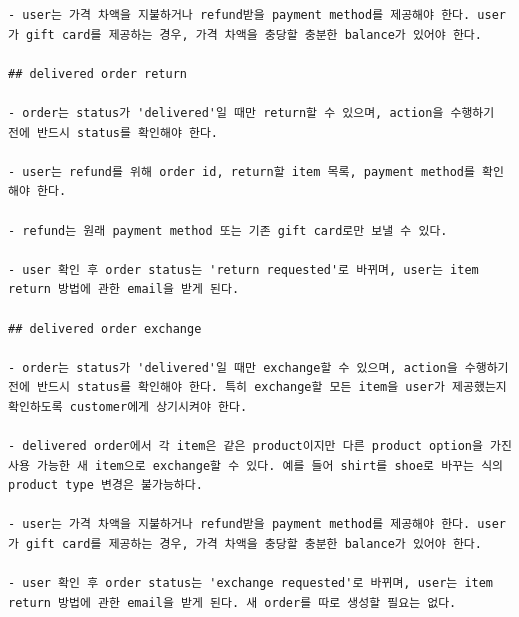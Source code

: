 \begin{verbatim}
- user는 가격 차액을 지불하거나 refund받을 payment method를 제공해야 한다. user가 gift card를 제공하는 경우, 가격 차액을 충당할 충분한 balance가 있어야 한다.

## delivered order return

- order는 status가 'delivered'일 때만 return할 수 있으며, action을 수행하기 전에 반드시 status를 확인해야 한다.

- user는 refund를 위해 order id, return할 item 목록, payment method를 확인해야 한다.

- refund는 원래 payment method 또는 기존 gift card로만 보낼 수 있다.

- user 확인 후 order status는 'return requested'로 바뀌며, user는 item return 방법에 관한 email을 받게 된다.

## delivered order exchange

- order는 status가 'delivered'일 때만 exchange할 수 있으며, action을 수행하기 전에 반드시 status를 확인해야 한다. 특히 exchange할 모든 item을 user가 제공했는지 확인하도록 customer에게 상기시켜야 한다.

- delivered order에서 각 item은 같은 product이지만 다른 product option을 가진 사용 가능한 새 item으로 exchange할 수 있다. 예를 들어 shirt를 shoe로 바꾸는 식의 product type 변경은 불가능하다.

- user는 가격 차액을 지불하거나 refund받을 payment method를 제공해야 한다. user가 gift card를 제공하는 경우, 가격 차액을 충당할 충분한 balance가 있어야 한다.

- user 확인 후 order status는 'exchange requested'로 바뀌며, user는 item return 방법에 관한 email을 받게 된다. 새 order를 따로 생성할 필요는 없다.
\end{verbatim}

